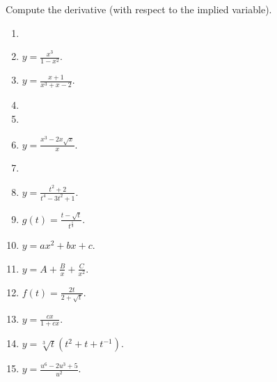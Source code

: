 Compute the derivative (with respect to the implied variable).
\begin{multicols}{2}
\begin{enumerate}[ref={\fcProblemRef}]
\item 
\item $\displaystyle y=\frac{x^3}{1-x^2}$.

\item $\displaystyle y=\frac{x+1}{x^3+x-2}$.

\item 
\item 
\item $\displaystyle y=\frac{x^3-2x\sqrt{x}}{x}$.

\item 
\item $\displaystyle y=\frac{t^2+2}{t^4-3t^2+1}$.

\item $\displaystyle g(t)=\frac{t-\sqrt{t}}{t^{\frac{1}{3}}}$.

\item $\displaystyle y=a x^2+b x + c$.

\item $\displaystyle y=A+\frac{B}x +\frac{C}{x^2}$.

\item $\displaystyle f(t)=\frac{2t}{2+\sqrt{t}}$.

\item $\displaystyle y=\frac{c x}{1+c x}$.

\item $\displaystyle y=\sqrt[3]{t}(t^2+t+t^{-1}) $.

\item $\displaystyle y=\frac{u^6-2u^3+5}{u^2}$.


\end{enumerate}
\end{multicols}
